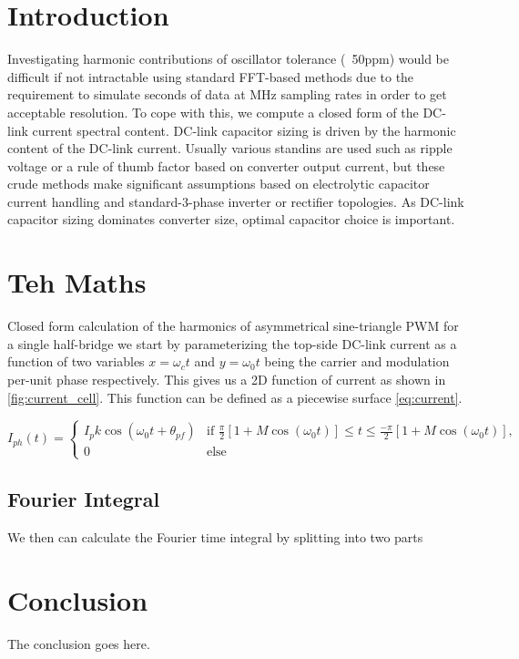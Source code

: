 \section{Introduction}
Investigating harmonic contributions of oscillator tolerance (~50ppm) would be
difficult if not intractable using standard FFT-based methods due to the
requirement to simulate seconds of data at MHz sampling rates in order to get
acceptable resolution.
To cope with this, we compute a closed form of the DC-link current spectral content.
DC-link capacitor sizing is driven by the harmonic content of the DC-link current.
Usually various standins are used such as ripple voltage or a rule of thumb
factor based on converter output current, but these crude methods make
significant assumptions based on electrolytic capacitor current handling and
standard-3-phase inverter or rectifier topologies.
As DC-link capacitor sizing dominates converter size, optimal capacitor choice
is important.

\section{Teh Maths}
Closed form calculation of the harmonics of asymmetrical sine-triangle PWM for
a single half-bridge we start by parameterizing the top-side DC-link current
as a function of two variables $x=\omega_{c} t$ and $y=\omega_{0} t$ being the
carrier and modulation per-unit phase respectively.
This gives us a 2D function of current as shown in \autoref{fig:current_cell}.
This function can be defined as a piecewise surface
\autoref{eq:current}.

\begin{equation}
\label{eq:current}
I_{ph} (t) = 
	\begin{cases}
	I_pk \cos \left({\omega_{0} t + \theta_{pf}}\right) 
	& \text{if } \frac{\pi}{2}\left[{1 + M \cos\left({\omega_{0} t}\right)}\right]
	\leq t \leq \frac{-\pi}{2}\left[{1 + M \cos\left({\omega_{0} t}\right)}\right],
	\\
	0 & \text{else}
	\end{cases}
\end{equation}

\subsection{Fourier Integral}
We then can calculate the Fourier time integral by splitting into two parts

\section{Conclusion}
The conclusion goes here.

